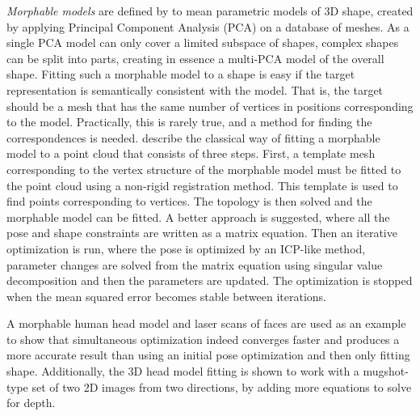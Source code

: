 \textit{Morphable models} are defined by \citet{schneider2010fitting} to mean parametric models of 3D shape, created by applying Principal Component Analysis (PCA) on a database of meshes. As a single PCA model can only cover a limited subspace of shapes, complex shapes can be split into parts, creating in essence a multi-PCA model of the overall shape. Fitting such a morphable model to a shape is easy if the target representation is semantically consistent with the model. That is, the target should be a mesh that has the same number of vertices in positions corresponding to the model. Practically, this is rarely true, and a method for finding the correspondences is needed. \citet{schneider2010fitting} describe the classical way of fitting a morphable model to a point cloud that consists of three steps. First, a template mesh corresponding to the vertex structure of the morphable model must be fitted to the point cloud using a non-rigid registration method. This template is used to find points corresponding to vertices. The topology is then solved and the morphable model can be fitted. A better approach is suggested, where all the pose and shape constraints are written as a matrix equation. Then an iterative optimization is run, where the pose is optimized by an ICP-like method, parameter changes are solved from the matrix equation using singular value decomposition and then the parameters are updated. The optimization is stopped when the mean squared error becomes stable between iterations.

A morphable human head model and laser scans of faces are used as an example to show that simultaneous optimization indeed converges faster and produces a more accurate result than using an initial pose optimization and then only fitting shape. Additionally, the 3D head model fitting is shown to work with a mugshot-type set of two 2D images from two directions, by adding more equations to solve for depth.

\newtopic

